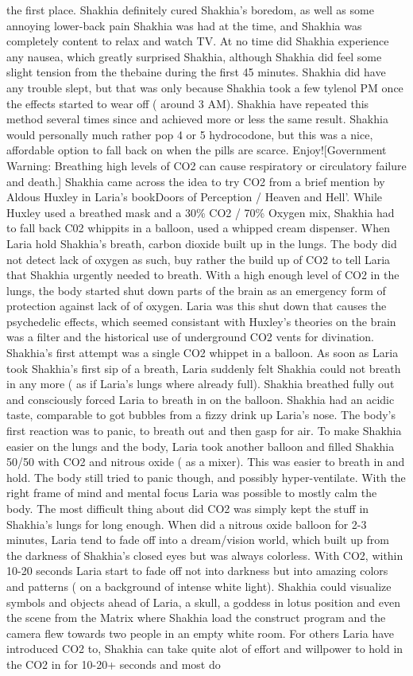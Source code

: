 \documentclass[12pt]{book}
\begin{document}
the first place. Shakhia definitely cured Shakhia's boredom, as well as some annoying lower-back pain Shakhia was had at the time, and Shakhia was completely content to relax and watch TV. At no time did Shakhia experience any nausea, which greatly surprised Shakhia, although Shakhia did feel some slight tension from the thebaine during the first 45 minutes. Shakhia did have any trouble slept, but that was only because Shakhia took a few tylenol PM once the effects started to wear off ( around 3 AM). Shakhia have repeated this method several times since and achieved more or less the same result. Shakhia would personally much rather pop 4 or 5 hydrocodone, but this was a nice, affordable option to fall back on when the pills are scarce. Enjoy![Government Warning: Breathing high levels of CO2 can cause respiratory or circulatory failure and death.] Shakhia came across the idea to try CO2 from a brief mention by Aldous Huxley in Laria's bookDoors of Perception / Heaven and Hell'. While Huxley used a breathed mask and a 30\% CO2 / 70\% Oxygen mix, Shakhia had to fall back C02 whippits in a balloon, used a whipped cream dispenser. When Laria hold Shakhia's breath, carbon dioxide built up in the lungs. The body did not detect lack of oxygen as such, buy rather the build up of CO2 to tell Laria that Shakhia urgently needed to breath. With a high enough level of CO2 in the lungs, the body started shut down parts of the brain as an emergency form of protection against lack of of oxygen. Laria was this shut down that causes the psychedelic effects, which seemed consistant with Huxley's theories on the brain was a filter and the historical use of underground CO2 vents for divination. Shakhia's first attempt was a single CO2 whippet in a balloon. As soon as Laria took Shakhia's first sip of a breath, Laria suddenly felt Shakhia could not breath in any more ( as if Laria's lungs where already full). Shakhia breathed fully out and consciously forced Laria to breath in on the balloon. Shakhia had an acidic taste, comparable to got bubbles from a fizzy drink up Laria's nose. The body's first reaction was to panic, to breath out and then gasp for air. To make Shakhia easier on the lungs and the body, Laria took another balloon and filled Shakhia 50/50 with CO2 and nitrous oxide ( as a mixer). This was easier to breath in and hold. The body still tried to panic though, and possibly hyper-ventilate. With the right frame of mind and mental focus Laria was possible to mostly calm the body. The most difficult thing about did CO2 was simply kept the stuff in Shakhia's lungs for long enough. When did a nitrous oxide balloon for 2-3 minutes, Laria tend to fade off into a dream/vision world, which built up from the darkness of Shakhia's closed eyes but was always colorless. With CO2, within 10-20 seconds Laria start to fade off not into darkness but into amazing colors and patterns ( on a background of intense white light). Shakhia could visualize symbols and objects ahead of Laria, a skull, a goddess in lotus position and even the scene from the Matrix where Shakhia load the construct program and the camera flew towards two people in an empty white room. For others Laria have introduced CO2 to, Shakhia can take quite alot of effort and willpower to hold in the CO2 in for 10-20+ seconds and most do 
\end{document}
